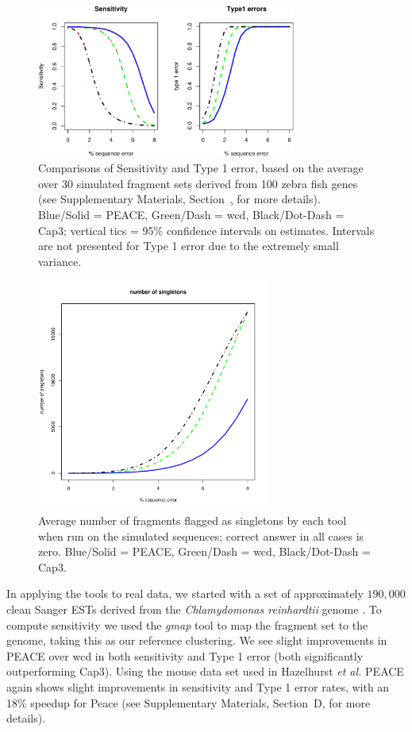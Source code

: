 \documentclass[a4,center,fleqn]{NAR}
\newcommand{\peace} {{\small PEACE}}
\begin{document}
\begin{figure}
  \centerline{\includegraphics[width=3.35in]{pics.d/SeT1.pdf}}
  \label{SeT1}
  \caption{Comparisons of Sensitivity and Type 1 error, based on the
    average over 30 simulated fragment sets derived from 100 zebra fish genes
    (see Supplementary Materials, Section~\href{sim_results}, for more
    details).   Blue/Solid = \peace, Green/Dash =
    {\sc wcd}, Black/Dot-Dash = {\sc Cap3}; vertical tics = 95\% confidence
    intervals on estimates.  Intervals are not presented for Type 1
    error due to the extremely small variance.}
\end{figure}

\begin{figure}
  \centerline{\includegraphics[width=3in]{pics.d/singletons.pdf}}
  \label{singletons}
  \caption{Average number of fragments flagged as singletons by each tool
    when run on the simulated sequences; correct answer in all cases is
    zero.  Blue/Solid = \peace, Green/Dash = {\sc wcd},
    Black/Dot-Dash = {\sc Cap3}.}
\end{figure}

In applying the tools to real data, we started with a set of
approximately $190,000$ clean Sanger ESTs derived from the {\it
  Chlamydomonas reinhardtii} genome \cite{Liang2008}.  To compute
sensitivity we used the {\it gmap} tool \cite{Wu05} to map the
fragment set to the genome, taking this as our reference clustering.
We see slight improvements in \peace\/ over {\sc wcd} in both
sensitivity and Type 1 error (both significantly outperforming {\sc
  Cap3}).  Using the mouse data set used in Hazelhurst {\it et al.}
\cite{Hazelhurst08a} \peace\/ again shows slight improvements in
sensitivity and Type 1 error rates, with an 18\% speedup for {\sc
  Peace} (see Supplementary Materials, Section~D, for more details).
\end{document}
